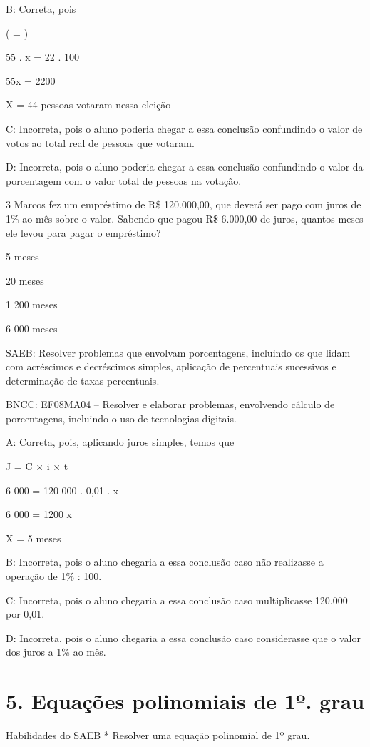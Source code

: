 {B: Correta, pois

( = )

55 . x = 22 . 100

55x = 2200

X = 44 pessoas votaram nessa eleição

C: Incorreta, pois o aluno poderia chegar a essa conclusão confundindo o
valor de votos ao total real de pessoas que votaram.

D: Incorreta, pois o aluno poderia chegar a essa conclusão confundindo o
valor da porcentagem com o valor total de pessoas na votação.

\num{3} Marcos fez um empréstimo de R\$ 120.000,00, que deverá ser pago com
juros de 1\% ao mês sobre o valor. Sabendo que pagou R\$ 6.000,00 de
juros, quantos meses ele levou para pagar o empréstimo?
\item 5 meses
\item 20 meses
\item 1 200 meses
\item 6 000 meses

SAEB: Resolver problemas que envolvam porcentagens, incluindo os que
lidam com acréscimos e decréscimos simples, aplicação de percentuais
sucessivos e determinação de taxas percentuais.

BNCC: EF08MA04 -- Resolver e elaborar problemas, envolvendo cálculo de
porcentagens, incluindo o uso de tecnologias digitais.

A: Correta, pois, aplicando juros simples, temos que

J = C × i × t

6 000 = 120 000 . 0,01 . x

6 000 = 1200 x

X = 5 meses

B: Incorreta, pois o aluno chegaria a essa conclusão caso não realizasse
a operação de 1\% : 100.

C: Incorreta, pois o aluno chegaria a essa conclusão caso multiplicasse
120.000 por 0,01.

D: Incorreta, pois o aluno chegaria a essa conclusão caso considerasse
que o valor dos juros a 1\% ao mês.


\section{5. Equações polinomiais de 1º.
grau}

Habilidades do SAEB * Resolver uma equação polinomial de 1º grau.

}
